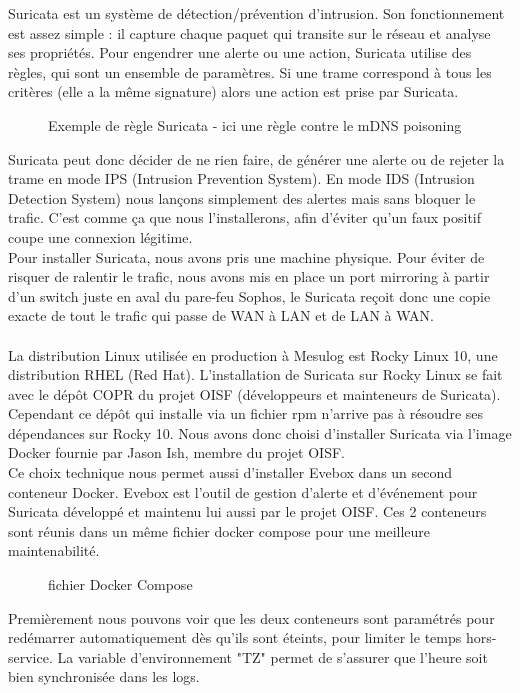 \documentclass[a4paper, 11pt]{article}
\begin{document}
Suricata est un système de détection/prévention d'intrusion. Son fonctionnement est assez simple : il capture chaque paquet qui transite sur le réseau et analyse ses propriétés. Pour engendrer une alerte ou une action, Suricata utilise des règles, qui sont un ensemble de paramètres. Si une trame correspond à tous les critères (elle a la même signature) alors une action est prise par Suricata.
\begin{figure}[H]
    \centering
    
  \label{fig:example-rule-corps}
  \caption{Exemple de règle Suricata - ici une règle contre le mDNS poisoning}
\end{figure}
Suricata peut donc décider de ne rien faire, de générer une alerte ou de rejeter la trame en mode IPS (Intrusion Prevention System). En mode IDS (Intrusion Detection System) nous lançons simplement des alertes mais sans bloquer le trafic. C'est comme ça que nous l'installerons, afin d'éviter qu'un faux positif coupe une connexion légitime.\\
 Pour installer Suricata, nous avons pris une machine physique. Pour éviter de risquer de ralentir le trafic, nous avons mis en place un port mirroring à partir d'un switch juste en aval du pare-feu Sophos, le Suricata reçoit donc une copie exacte de tout le trafic qui passe de WAN à LAN et de LAN à WAN.\\
 \\
 La distribution Linux utilisée en production à Mesulog est Rocky Linux 10, une distribution RHEL (Red Hat). L'installation de Suricata sur Rocky Linux se fait avec le dépôt COPR du projet OISF (développeurs et mainteneurs de Suricata).
 \newpage
  Cependant ce dépôt qui installe via un fichier rpm n'arrive pas à résoudre ses dépendances sur Rocky 10. Nous avons donc choisi d'installer Suricata via l'image Docker fournie par Jason Ish, membre du projet OISF.\\
  Ce choix technique nous permet aussi d'installer Evebox dans un second conteneur Docker. Evebox est l'outil de gestion d'alerte et d'événement pour Suricata développé et maintenu lui aussi par le projet OISF.
  Ces 2 conteneurs sont réunis dans un même fichier docker compose pour une meilleure maintenabilité.
\begin{figure}[H]
    \centering
    
  \label{fig:compose-yaml}
  \caption{fichier Docker Compose}
\end{figure}
\par\bigskip
Premièrement nous pouvons voir que les deux conteneurs sont paramétrés pour redémarrer automatiquement dès qu'ils sont éteints, pour limiter le temps hors-service. La variable d'environnement "TZ" permet de s'assurer que l'heure soit bien synchronisée dans les logs.\\
\end{document}
